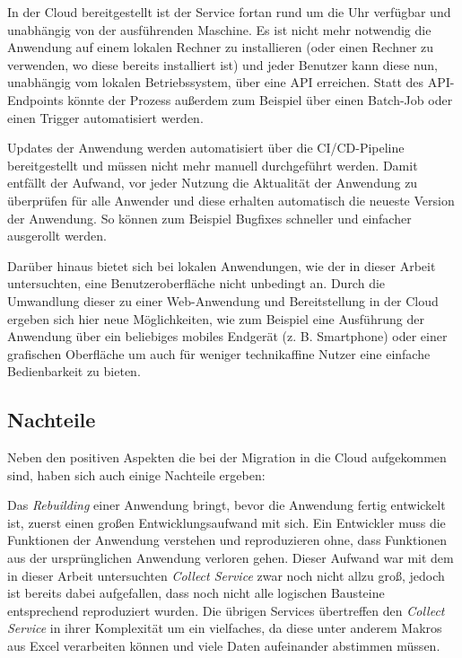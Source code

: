In der Cloud bereitgestellt ist der Service fortan rund um die Uhr verfügbar und unabhängig von der ausführenden Maschine. Es ist nicht mehr notwendig die Anwendung auf einem lokalen Rechner zu installieren (oder einen Rechner zu verwenden, wo diese bereits installiert ist) und jeder Benutzer kann diese nun, unabhängig vom lokalen Betriebssystem, über eine \ac{API} erreichen. Statt des \ac{API}-Endpoints könnte der Prozess außerdem zum Beispiel über einen Batch-Job oder einen Trigger automatisiert werden.

Updates der Anwendung werden automatisiert über die \ac{CI/CD}-Pipeline bereitgestellt und müssen nicht mehr manuell durchgeführt werden. Damit entfällt der Aufwand, vor jeder Nutzung die Aktualität der Anwendung zu überprüfen für alle Anwender und diese erhalten automatisch die neueste Version der Anwendung. So können zum Beispiel Bugfixes schneller und einfacher ausgerollt werden. 

Darüber hinaus bietet sich bei lokalen Anwendungen, wie der in dieser Arbeit untersuchten, eine Benutzeroberfläche nicht unbedingt an. Durch die Umwandlung dieser zu einer Web-Anwendung und Bereitstellung in der Cloud ergeben sich hier neue Möglichkeiten, wie zum Beispiel eine Ausführung der Anwendung über ein beliebiges mobiles Endgerät (z. B. Smartphone) oder einer grafischen Oberfläche um auch für weniger technikaffine Nutzer eine einfache Bedienbarkeit zu bieten. \pagebreak

\subsection{Nachteile}
Neben den positiven Aspekten die bei der Migration in die Cloud aufgekommen sind, haben sich auch einige Nachteile ergeben:

Das \textit{Rebuilding} einer Anwendung bringt, bevor die Anwendung fertig entwickelt ist, zuerst einen großen Entwicklungsaufwand mit sich. Ein Entwickler muss die Funktionen der Anwendung verstehen und reproduzieren ohne, dass Funktionen aus der ursprünglichen Anwendung verloren gehen. Dieser Aufwand war mit dem in dieser Arbeit untersuchten \textit{Collect Service} zwar noch nicht allzu groß, jedoch ist bereits dabei aufgefallen, dass noch nicht alle logischen Bausteine entsprechend reproduziert wurden. Die übrigen Services übertreffen den \textit{Collect Service} in ihrer Komplexität um ein vielfaches, da diese unter anderem Makros aus Excel verarbeiten können und viele Daten aufeinander abstimmen müssen.

